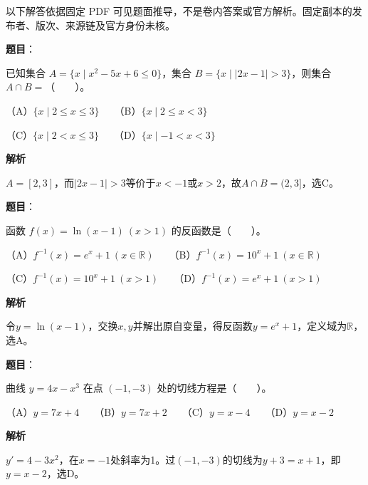 

\begin{gktip}
以下解答依据固定 PDF 可见题面推导，不是卷内答案或官方解析。固定副本的发布者、版次、来源链及官方身份未核。
\end{gktip}

\begin{answer}

\textbf{题目}：

已知集合 $A=\{x\mid x^2-5x+6\leqslant0\}$，集合 $B=\{x\mid |2x-1|>3\}$，则集合 $A\cap B=$\mbox{（　　）}。

（A）$\{x\mid 2\leqslant x\leqslant3\}$　　（B）$\{x\mid 2\leqslant x<3\}$

（C）$\{x\mid 2<x\leqslant3\}$　　（D）$\{x\mid -1<x<3\}$

\textbf{解析}

$A=[2,3]$，而$|2x-1|>3$等价于$x<-1$或$x>2$，故$A\cap B=(2,3]$，选C。


\end{answer}
\begin{answer}

\textbf{题目}：

函数 $f(x)=\ln(x-1)\ (x>1)$ 的反函数是\mbox{（　　）}。

（A）$f^{-1}(x)=e^x+1\ (x\in\mathbb R)$　　（B）$f^{-1}(x)=10^x+1\ (x\in\mathbb R)$

（C）$f^{-1}(x)=10^x+1\ (x>1)$　　（D）$f^{-1}(x)=e^x+1\ (x>1)$

\textbf{解析}

令$y=\ln(x-1)$，交换$x,y$并解出原自变量，得反函数$y=e^x+1$，定义域为$\mathbb R$，选A。


\end{answer}
\begin{answer}

\textbf{题目}：

曲线 $y=4x-x^3$ 在点 $(-1,-3)$ 处的切线方程是\mbox{（　　）}。

（A）$y=7x+4$　　（B）$y=7x+2$　　（C）$y=x-4$　　（D）$y=x-2$

\textbf{解析}

$y'=4-3x^2$，在$x=-1$处斜率为1。过$(-1,-3)$的切线为$y+3=x+1$，即$y=x-2$，选D。


\end{answer}
